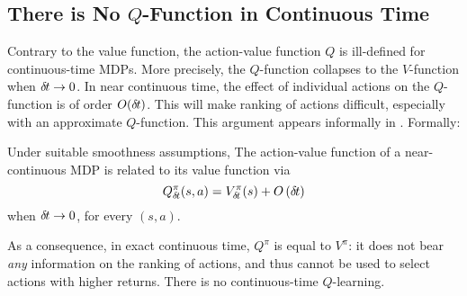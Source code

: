 \subsection{There is No $Q$-Function in Continuous Time}

Contrary to the value function, the action-value function $Q$ is ill-defined
for continuous-time MDPs. More precisely, the $Q$-function  collapses to the
$V$-function when ${\delta\hspace{-.1em}t} \rightarrow 0$. In near continuous time, the effect of
individual actions on the $Q$-function is of order $O({\delta\hspace{-.1em}t})$. This
will make 
ranking of actions difficult, especially with an approximate
$Q$-function.
This argument appears informally in \cite{adv_upd}.
Formally:
\begin{theorem}
  \label{th:q-cont}
  Under suitable smoothness assumptions,
The action-value function of a near-continuous MDP is related to its
value function via
\begin{equation}
	\label{eq:q-discr}
	Q^\pi_{\delta\hspace{-.1em}t}(s, a) = V^\pi_{\delta\hspace{-.1em}t}(s) + O\left({\delta\hspace{-.1em}t}\right)
\end{equation}
when ${\delta\hspace{-.1em}t} \to 0$, for every $(s,a)$.
\end{theorem}

As a consequence, in exact continuous time,
$Q^\pi$ is equal to $V^\pi$:  it does not bear \emph{any} information on the ranking of actions, and
thus cannot be used to select actions with higher returns.
There is no continuous-time $Q$-learning.


